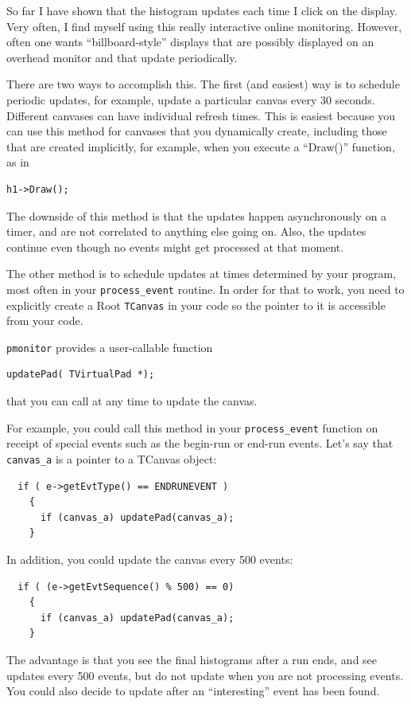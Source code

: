 \documentclass{article}[11pt]
\begin{document}
So far I have shown that the histogram updates each time I click on
the display. Very often, I find myself using this really interactive
online monitoring. However, often one wants ``billboard-style''
displays that are possibly displayed on an overhead monitor and that
update periodically.

There are two ways to accomplish this. The first (and easiest) way is
to schedule periodic updates, for example, update a particular canvas
every 30 seconds. Different canvases can have individual refresh
times. This is easiest because you can use this method for canvases that
you dynamically create, including those that are created implicitly,
for example, when you execute a ``Draw()'' function, as in
\begin{verbatim}
h1->Draw();
\end{verbatim}
The downside of this method is that the updates happen asynchronously
on a timer, and are not correlated to anything else going on. Also,
the updates continue even though no events might get processed
at that moment.

The other method is to schedule updates at times determined by your
program, most often in your \verb|process_event| routine. In order for
that to work, you need to explicitly create a Root \verb|TCanvas| in
your code so the pointer to it is accessible from your code.

\verb|pmonitor| provides a user-callable function
\begin{verbatim}
updatePad( TVirtualPad *);
\end{verbatim}
that you can call at any time to update the canvas.

For example, you could call this method in your \verb|process_event|
function on receipt of special events such as the begin-run or end-run
events. Let's say that \verb|canvas_a| is a pointer to a TCanvas object:

\begin{verbatim}
  if ( e->getEvtType() == ENDRUNEVENT )
    {
      if (canvas_a) updatePad(canvas_a);
    }
\end{verbatim}

In addition, you could update the canvas every 500 events:

\begin{verbatim}
  if ( (e->getEvtSequence() % 500) == 0)
    {
      if (canvas_a) updatePad(canvas_a);
    }
\end{verbatim}

The advantage is that you see the final histograms after a run ends,
and see updates every 500 events, but do not update when you are not
processing events. You could also decide to update after an
``interesting'' event has been found.
\end{document}
